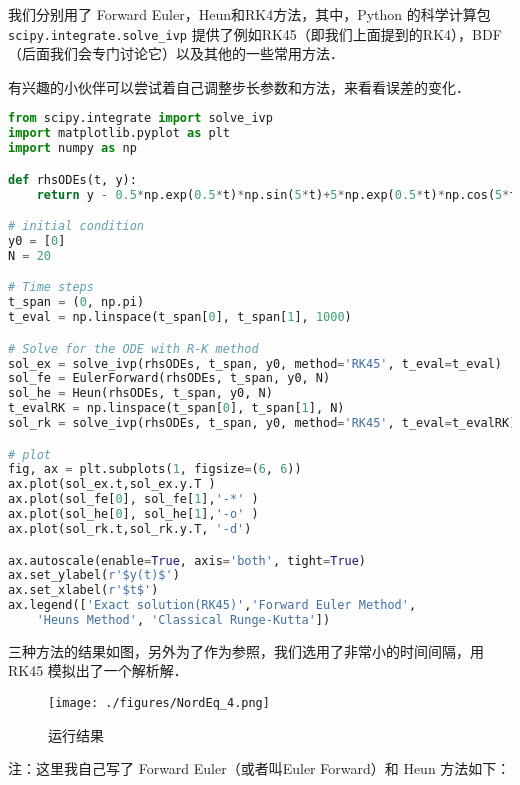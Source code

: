 我们分别用了 Forward Euler，Heun和RK4方法，其中，Python 的科学计算包 \verb|scipy.integrate.solve_ivp|   提供了例如RK45（即我们上面提到的RK4），BDF（后面我们会专门讨论它）以及其他的一些常用方法．

有兴趣的小伙伴可以尝试着自己调整步长参数和方法，来看看误差的变化．
\begin{lstlisting}[language=python]
from scipy.integrate import solve_ivp
import matplotlib.pyplot as plt
import numpy as np

def rhsODEs(t, y):
    return y - 0.5*np.exp(0.5*t)*np.sin(5*t)+5*np.exp(0.5*t)*np.cos(5*t)

# initial condition
y0 = [0]
N = 20

# Time steps
t_span = (0, np.pi)
t_eval = np.linspace(t_span[0], t_span[1], 1000)

# Solve for the ODE with R-K method
sol_ex = solve_ivp(rhsODEs, t_span, y0, method='RK45', t_eval=t_eval)
sol_fe = EulerForward(rhsODEs, t_span, y0, N)
sol_he = Heun(rhsODEs, t_span, y0, N)
t_evalRK = np.linspace(t_span[0], t_span[1], N)
sol_rk = solve_ivp(rhsODEs, t_span, y0, method='RK45', t_eval=t_evalRK)

# plot
fig, ax = plt.subplots(1, figsize=(6, 6))
ax.plot(sol_ex.t,sol_ex.y.T )
ax.plot(sol_fe[0], sol_fe[1],'-*' )
ax.plot(sol_he[0], sol_he[1],'-o' )
ax.plot(sol_rk.t,sol_rk.y.T, '-d')

ax.autoscale(enable=True, axis='both', tight=True)
ax.set_ylabel(r'$y(t)$')
ax.set_xlabel(r'$t$')
ax.legend(['Exact solution(RK45)','Forward Euler Method',
    'Heuns Method', 'Classical Runge-Kutta'])
\end{lstlisting}

三种方法的结果如图，另外为了作为参照，我们选用了非常小的时间间隔，用 RK45 模拟出了一个解析解．

\begin{figure}[ht]
\centering
\texttt{[image: ./figures/NordEq\_4.png]}
\caption{运行结果} \label{NordEq_fig4}
\end{figure}

注：这里我自己写了 Forward Euler（或者叫Euler Forward）和 Heun 方法如下：

